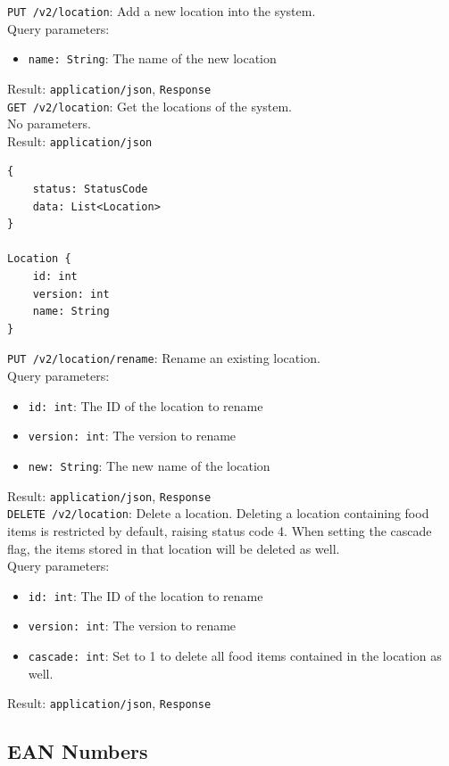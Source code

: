 \documentclass[12pt]{report}
\begin{document}
\texttt{PUT /v2/location}: Add a new location into the system.\\
Query parameters:
\begin{itemize}
\item \texttt{name: String}: The name of the new location
\end{itemize}
Result: \texttt{application/json}, \texttt{Response}\vspace{7mm}\\
\texttt{GET /v2/location}: Get the locations of the system.\\
No parameters.\\
Result: \texttt{application/json}
\begin{lstlisting}
{
    status: StatusCode
    data: List<Location>
}

Location {
    id: int
    version: int
    name: String
}
\end{lstlisting}\vspace{7mm}
\texttt{PUT /v2/location/rename}: Rename an existing location.\\
Query parameters:
\begin{itemize}
\item \texttt{id: int}: The ID of the location to rename
\item \texttt{version: int}: The version to rename
\item \texttt{new: String}: The new name of the location
\end{itemize}
Result: \texttt{application/json}, \texttt{Response}\vspace{7mm}\\
\texttt{DELETE /v2/location}: Delete a location. Deleting a location containing
food items is restricted by default, raising status code 4. When setting the
cascade flag, the items stored in that location will be deleted as well.\\
Query parameters:
\begin{itemize}
\item \texttt{id: int}: The ID of the location to rename
\item \texttt{version: int}: The version to rename
\item \texttt{cascade: int}: Set to 1 to delete all food items contained
in the location as well.
\end{itemize}
Result: \texttt{application/json}, \texttt{Response}\vspace{7mm}\\

\subsection{EAN Numbers}
\end{document}
